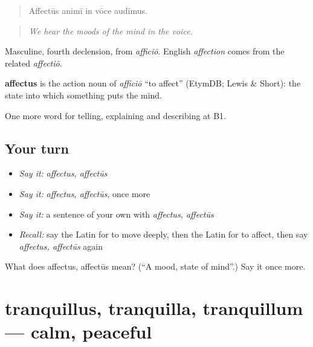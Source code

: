 \begin{quote}
Affectūs animī in vōce audīmus.
\end{quote}

\begin{quote}
\emph{We hear the moods of the mind in the voice.}
\end{quote}

Masculine, fourth declension, from \emph{afficiō}. English \emph{affection} comes from the related \emph{affectiō}.

\begin{cousinweb}
\textbf{affectus} is the action noun of \emph{afficiō} \textquotedblleft{}to affect\textquotedblright{} (EtymDB; Lewis \& Short): the state into which something puts the mind.
\end{cousinweb}

\begin{grammarlens}[title={What you've built}]
One more word for telling, explaining and describing at B1.
\end{grammarlens}

\subsection*{Your turn}
\begin{itemize}
\raggedright
  \item \emph{Say it:} \emph{affectus, affectūs}
  \item \emph{Say it:} \emph{affectus, affectūs}, once more
  \item \emph{Say it:} a sentence of your own with \emph{affectus, affectūs}
  \item \emph{Recall:} say the Latin for to move deeply, then the Latin for to affect, then say \emph{affectus, affectūs} again
\end{itemize}

\begin{tcolorbox}[breakable,colback=teal!4,colframe=teal!35!black,title={Before you move on}]
What does affectus, affectūs mean? (\textquotedblleft{}A mood, state of mind\textquotedblright{}.) Say it once more.
\end{tcolorbox}
\section[tranquillus, tranquilla, tranquillum]{tranquillus, tranquilla, tranquillum — calm, peaceful}

\label{lesson:LA-C501-tranquillus}



